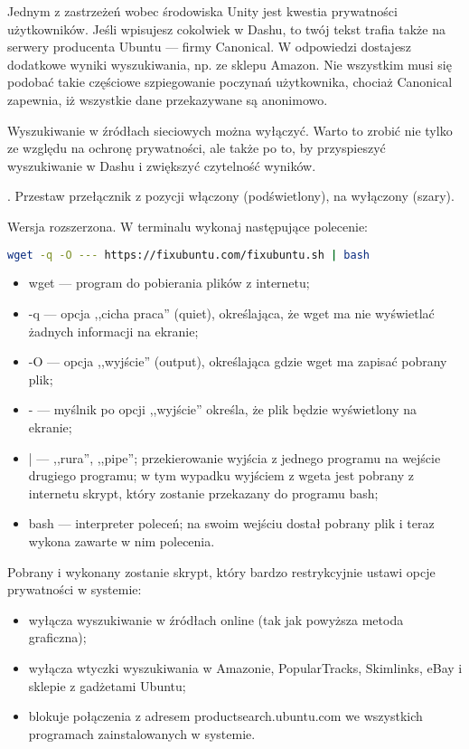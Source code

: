 Jednym z zastrzeżeń wobec środowiska Unity jest kwestia prywatności użytkowników. Jeśli wpisujesz cokolwiek w Dashu, to twój tekst trafia także na serwery producenta Ubuntu --- firmy Canonical. W odpowiedzi dostajesz dodatkowe wyniki wyszukiwania, np. ze sklepu Amazon. Nie wszystkim musi się podobać takie częściowe szpiegowanie poczynań użytkownika, chociaż Canonical zapewnia, iż wszystkie dane przekazywane są anonimowo.

Wyszukiwanie w źródłach sieciowych można wyłączyć. Warto to zrobić nie tylko ze względu na ochronę prywatności, ale także po to, by przyspieszyć wyszukiwanie w Dashu i zwiększyć czytelność wyników.

\noindent {}. Przestaw przełącznik z pozycji włączony (podświetlony), na wyłączony (szary).

Wersja rozszerzona. W terminalu wykonaj następujące polecenie:
\begin{lstlisting}[language=bash]
wget -q -O --- https://fixubuntu.com/fixubuntu.sh | bash
\end{lstlisting}
\begin{itemize}
\item \textcolor{ubuntu_orange}{wget} --- program do pobierania plików z internetu;
\item \textcolor{ubuntu_orange}{-q} --- opcja ,,cicha praca'' (quiet), określająca, że wget ma nie wyświetlać żadnych informacji na ekranie;
\item \textcolor{ubuntu_orange}{-O} --- opcja ,,wyjście'' (output), określająca gdzie wget ma zapisać pobrany plik;
\item \textcolor{ubuntu_orange}{-} --- myślnik po opcji ,,wyjście'' określa, że plik będzie wyświetlony na ekranie;
\item \textcolor{ubuntu_orange}{|} --- ,,rura'', ,,pipe''; przekierowanie wyjścia z jednego programu na wejście drugiego programu; w tym wypadku wyjściem z wgeta jest pobrany z internetu skrypt, który zostanie przekazany do programu bash;
\item \textcolor{ubuntu_orange}{bash} --- interpreter poleceń; na swoim wejściu dostał pobrany plik i teraz wykona zawarte w nim polecenia.
\end{itemize}
Pobrany i wykonany zostanie skrypt, który bardzo restrykcyjnie ustawi opcje prywatności w systemie:
\begin{itemize}
\item wyłącza wyszukiwanie w źródłach online (tak jak powyższa metoda graficzna);
\item wyłącza wtyczki wyszukiwania w Amazonie, PopularTracks, Skimlinks, eBay i sklepie z gadżetami Ubuntu;
\item blokuje połączenia z adresem productsearch.ubuntu.com we wszystkich programach zainstalowanych w systemie.
\end{itemize}
